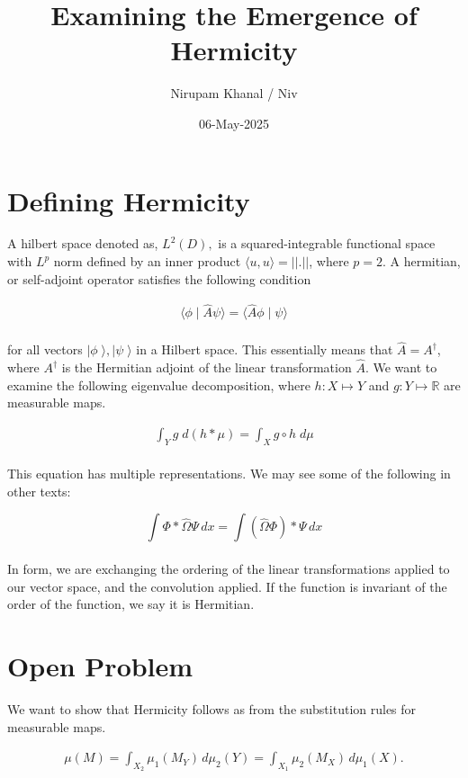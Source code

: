 \documentclass{article}
\begin{document}
\title{Examining the Emergence of Hermicity}
\author{Nirupam Khanal / Niv}
\date{06-May-2025}

\maketitle
\tableofcontents

\section{Defining Hermicity}
A hilbert space denoted as, $L^{2}(D),$ is a squared-integrable functional space with $L^{p}$ norm defined by an inner product $\langle u,u\rangle = ||.||$, where $p=2$. A hermitian, or self-adjoint operator satisfies the following condition 

\begin{align}
    \langle \phi \mid \hat A \psi\rangle = \langle \hat A \phi \mid \psi \rangle
\end{align} \\ 
for all vectors $\mid\phi\;\rangle, \mid \psi\;\rangle$ in a Hilbert space. This essentially means that $\hat A = A^\dagger$, where $A^{\dagger}$ is the Hermitian adjoint of the linear transformation $\hat A$. We want to examine the following eigenvalue decomposition, where $h:X \mapsto Y$ and $g:Y \mapsto \mathbb{R}$ are measurable maps.

\begin{align}
    \int_{Y} g \;d(h*\mu) = \int_{X} g \circ h \; d\mu
\end{align} \\ 
This equation has multiple representations. We may see some of the following in other texts: 

\[
\int \Phi * \hat\Omega \Psi \,dx = \int (\hat\Omega \Phi) * \Psi \,dx
\] \\ 
In form, we are exchanging the ordering of the linear transformations applied to our vector space, and the convolution applied. If the function is invariant of the order of the function, we say it is Hermitian. 

\section{Open Problem}
We want to show that Hermicity follows as from the substitution rules for measurable maps. 

\begin{align}
    \mu(M) = \int_{X_{2}} \mu_{1} (M_{Y}) \, d\mu_{2}(Y) = \int_{X_{1}} \mu_{2} (M_{X}) \, d\mu_{1}(X).
\end{align}
\end{document}
